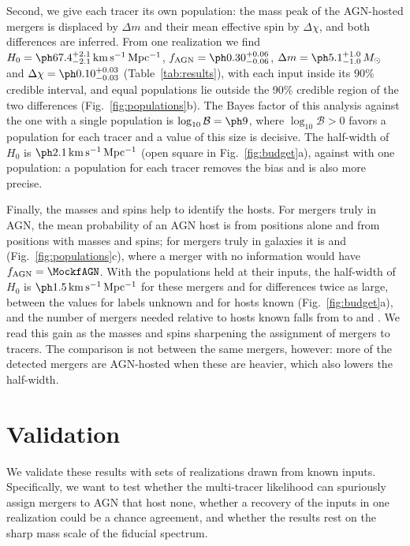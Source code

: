 \documentclass[aps,prd,reprint,amsmath,amssymb,nofootinbib]{revtex4-2}
\newcommand{\kmsMpc}{\,{\rm km\,s^{-1}\,Mpc^{-1}}}
\newcommand{\Msun}{\,M_\odot}
\newcommand{\fAGN}{f_{\rm AGN}}
\newcommand{\lB}{\log_{10}\mathcal{B}}
\begin{document}
Second, we give each tracer its own population: the mass peak of the AGN-hosted mergers is displaced by $\Delta m$ and their mean effective spin by $\Delta\chi$, and both differences are inferred.
From one realization we find $H_0=\IndTwoPopHzero\kmsMpc$, $\fAGN=\IndTwoPopfAGN$, $\Delta m=\IndTwoPopDm\Msun$ and $\Delta\chi=\IndTwoPopDchi$ (Table~\ref{tab:results}), with each input inside its 90\% credible interval, and equal populations lie outside the 90\% credible region of the two differences (Fig.~\ref{fig:populations}b). %
The Bayes factor of this analysis against the one with a single population is $\lB=\IndLB$, where $\lB>0$ favors a population for each tracer and a value of this size is decisive. %
The half-width of $H_0$ is $\IndTwoPopHW\kmsMpc$ (open square in Fig.~\ref{fig:budget}a), against \IndHWOnePop{} with one population: a population for each tracer removes the bias and is also more precise. %

Finally, the masses and spins help to identify the hosts.
For mergers truly in AGN, the mean probability of an AGN host is \IndProbAGNPos{} from positions alone and \IndProbAGNMark{} from positions with masses and spins; for mergers truly in galaxies it is \IndProbGalPos{} and \IndProbGalMark{} (Fig.~\ref{fig:populations}c), where a merger with no information would have $\fAGN=\MockfAGN$. %
With the populations held at their inputs, the half-width of $H_0$ is $\IndHWMark\kmsMpc$ for these mergers and \IndHWMarkTwice{} for differences twice as large, between the values for labels unknown and for hosts known (Fig.~\ref{fig:budget}a), and the number of mergers needed relative to hosts known falls from \IndCostMix{} to \IndCostMark{} and \IndCostMarkTwice. %
We read this gain as the masses and spins sharpening the assignment of mergers to tracers. %
The comparison is not between the same mergers, however: more of the detected mergers are AGN-hosted when these are heavier, which also lowers the half-width.

\section{Validation}
\label{sec:validation}

We validate these results with sets of realizations drawn from known inputs.
Specifically, we want to test whether the multi-tracer likelihood can spuriously assign mergers to AGN that host none, whether a recovery of the inputs in one realization could be a chance agreement, and whether the results rest on the sharp mass scale of the fiducial spectrum.
\end{document}
